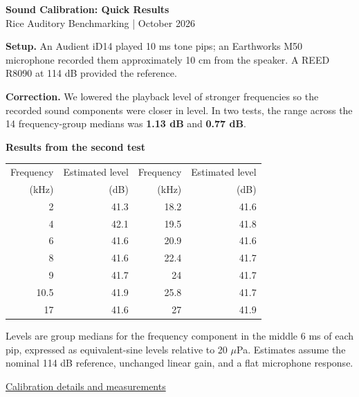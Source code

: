 \documentclass[11pt,letterpaper]{article}
\begin{document}
{\Large\bfseries Sound Calibration: Quick Results}\\
{\small Rice Auditory Benchmarking \quad |  October 2026}

\textbf{Setup.} An Audient iD14 played 10 ms tone pips; an Earthworks M50 microphone recorded them approximately 10 cm from the speaker. A REED R8090 at 114 dB provided the reference.

\textbf{Correction.} We lowered the playback level of stronger frequencies so the recorded sound components were closer in level. In two tests, the range across the 14 frequency-group medians was \textbf{1.13 dB} and \textbf{0.77 dB}.

\textbf{Results from the second test}
\begin{center}
\begin{tabular}{@{}rr@{\hspace{3em}}rr@{}}
\toprule
Frequency & Estimated level & Frequency & Estimated level\\
(kHz) & (dB) & (kHz) & (dB)\\
\midrule
2    & 41.3 & 18.2 & 41.6\\
4    & 42.1 & 19.5 & 41.8\\
6    & 41.6 & 20.9 & 41.6\\
8    & 41.6 & 22.4 & 41.7\\
9    & 41.7 & 24   & 41.7\\
10.5 & 41.9 & 25.8 & 41.7\\
17   & 41.6 & 27   & 41.9\\
\bottomrule
\end{tabular}
\end{center}

{\small Levels are group medians for the frequency component in the middle 6 ms of each pip, expressed as equivalent-sine levels relative to 20 $\mu$Pa. Estimates assume the nominal 114 dB reference, unchanged linear gain, and a flat microphone response.}

{\small \href{https://howardwhsrun.github.io/audiotory_benchmark/web/calibration/}{Calibration details and measurements}}
\end{document}
